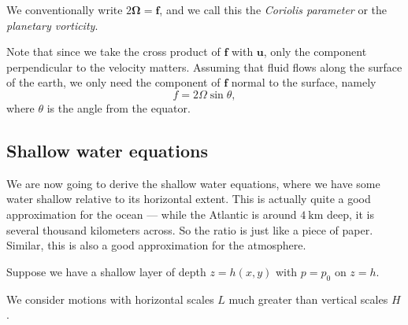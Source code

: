 \documentclass[a4paper]{article}
\begin{document}
\begin{defi}
  We conventionally write $2 \boldsymbol\Omega = \mathbf{f}$, and we call this the \emph{Coriolis parameter} or the \emph{planetary vorticity}.
\end{defi}

Note that since we take the cross product of $\mathbf{f}$ with $\mathbf{u}$, only the component perpendicular to the velocity matters. Assuming that fluid flows along the surface of the earth, we only need the component of $\mathbf{f}$ normal to the surface, namely
\[
  f = 2 \Omega \sin \theta,
\]
where $\theta$ is the angle from the equator.
\subsection{Shallow water equations}
We are now going to derive the shallow water equations, where we have some water shallow relative to its horizontal extent. This is actually quite a good approximation for the ocean --- while the Atlantic is around $\SI{4}{\kilo\meter}$ deep, it is several thousand kilometers across. So the ratio is just like a piece of paper. Similar, this is also a good approximation for the atmosphere.

Suppose we have a shallow layer of depth $z = h(x, y)$ with $p = p_0$ on $z = h$.
\begin{center}
\end{center}
We consider motions with horizontal scales $L$ much greater than vertical scales $H$.
\end{document}
